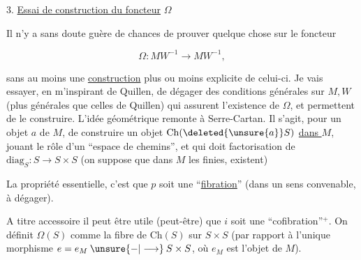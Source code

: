 3. \uline{Essai de construction du foncteur} $\Omega$

Il n'y a sans doute guère de chances de prouver quelque chose sur le foncteur

\[
 \Omega:MW^{-1}\longrightarrow MW^{-1},
\]

sans  au moins une \uline{construction} plus ou moins explicite de celui-ci. Je vais essayer,  en m'inspirant de Quillen, de dégager des conditions générales sur $M,W$ (plus générales que celles de Quillen) qui assurent l'existence de $\Omega$, et permettent de le construire. L'idée géométrique remonte à Serre-Cartan.  Il s'agit, pour un objet $a$ de $M$, de construire un objet  $\mathrm{Ch}(\deleted{\unsure{a}}S)$ \uline{dans $M$}, jouant le rôle d'un  ``espace de chemins'', et qui doit   factorisation de \deleted{\unsure{\(\Delta\)}} $\mathrm{diag}_S:S\longrightarrow S\times S$ (on suppose que dans $M$ les   finies,  existent)


La propriété essentielle, c'est que $p$ soit une ``\uline{fibration}'' (dans un sens convenable, à dégager).

A titre accessoire il peut être utile (peut-être) que $i$ soit une ``cofibration''$^{+}$. On définit $\Omega(S)$ comme la fibre de $\mathrm{Ch}(S)$ sur $S\times S$ (par rapport à l'unique morphisme $e=e_M\mathbin{\unsure{-|\longrightarrow}}S\times S$, où $e_M$ est l'objet   de $M$).



